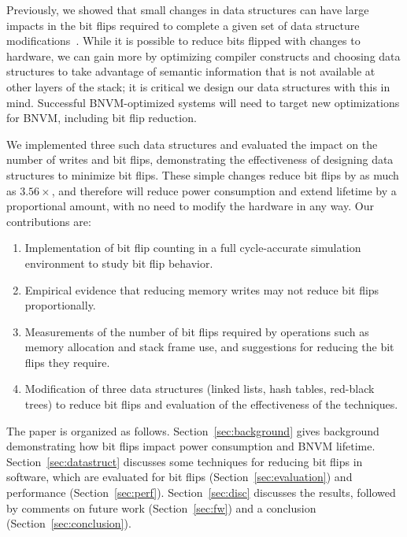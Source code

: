 Previously, we showed that small changes in data
structures can have large impacts in the bit flips required to
complete a given set of data structure modifications~\cite{bittman:nvmsa18}.
While it is possible to
reduce bits flipped with changes to hardware, we can gain more
by optimizing compiler constructs and choosing data structures to take advantage
of semantic information that is not available at other layers of the stack;
it is critical we design our data structures with this in mind. Successful BNVM-optimized
systems will need to target new optimizations for BNVM, including bit flip reduction.

We implemented three such
data structures and evaluated the impact on the number of writes and bit flips,
demonstrating the effectiveness of designing data structures to minimize bit
flips.
These simple changes reduce bit flips by as much as $3.56\times$, and therefore will reduce power
consumption and extend lifetime by a proportional amount,
with no need to modify the hardware in any way.
Our contributions are:
\begin{enumerate}
	\item Implementation of bit flip counting in a full cycle-accurate simulation
	      environment to study bit
	      flip behavior.%
	\item Empirical evidence that reducing memory writes may not reduce bit flips
	      proportionally.
	\item Measurements of the number of bit flips required by operations such as
	      memory allocation and stack frame use, and suggestions for reducing the
	      bit flips they require.
	\item Modification of three data structures (linked lists, hash tables, red-black
	      trees) to reduce bit flips and evaluation of the effectiveness of the techniques.
\end{enumerate}

The paper is organized as follows. Section~\ref{sec:background} gives
background demonstrating how bit flips impact power consumption and
BNVM lifetime. Section~\ref{sec:datastruct} discusses some techniques for
reducing bit flips in software, which are evaluated for bit flips
(Section~\ref{sec:evaluation}) and performance (Section~\ref{sec:perf}).
Section~\ref{sec:disc} discusses the results, followed by comments on
future work (Section~\ref{sec:fw}) and a conclusion
(Section~\ref{sec:conclusion}).

